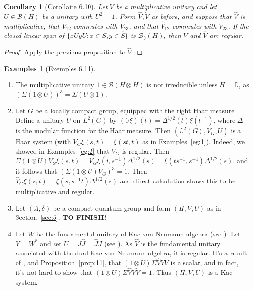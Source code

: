 \documentclass[a4paper,12pt]{article}
\theoremstyle{plain}
\newtheorem{corollary}[proposition]{Corollary}
\theoremstyle{definition}
\newtheorem{examples}[proposition]{Examples}
\newcommand{\mc}{\mathcal}
\begin{document}
\begin{corollary}[Corollaire 6.10]
Let $V$ be a multiplicative unitary and let $U\in\mc B(H)$ be a unitary with
$U^2=1$.  Form $\hat V,\tilde V$ as before, and suppose that $\hat V$ is
multiplicative, that $V_{12}$ commutes with $\tilde V_{23}$, and that
$\hat V_{12}$ commutes with $V_{23}$.  If the closed linear span of
$\{ x UyU : x\in S, y\in \hat S \}$ is $\mc B_0(H)$, then $\tilde V$ and
$\hat V$ are regular.
\end{corollary}
\begin{proof}
Apply the previous proposition to $\hat V$.
\end{proof}

\begin{examples}[Exemples 6.11]
\begin{enumerate}
\item The multiplicative unitary $1\in\mc B(H\otimes H)$ is not
irreducible unless $H=\mathbb C$, as $(\Sigma(1\otimes U))^3
= \Sigma(U\otimes 1)$.
\item Let $G$ be a locally compact group, equipped with the right Haar measure.
Define a unitary $U$ on $L^2(G)$ by $(U\xi)(t)=\Delta^{1/2}(t)\xi(t^{-1})$,
where $\Delta$ is the modular function for the Haar measure.  Then
$(L^2(G), V_G, U)$ is a Haar system (with $V_G\xi(s,t)=\xi(st,t)$ as
in Examples~\ref{eg:1}).  Indeed, we showed in Examples~\ref{eg:2} that $V_G$
is regular.  Then $\Sigma(1\otimes U)V_G\xi(s,t) = V_G\xi(t,s^{-1})\Delta^{1/2}(s)
= \xi(ts^{-1},s^{-1})\Delta^{1/2}(s)$, and it follows that
$(\Sigma(1\otimes U)V_G)^3=1$.  Then $\hat V_G\xi(s,t) = \xi(s,s^{-1}t)
\Delta^{1/2}(s)$ and direct calculation shows this to be multiplicative
and regular.
\item Let $(A,\delta)$ be a compact quantum group and form $(H,V,U)$ as
in Section~\ref{sec:5}.  \textbf{TO FINISH!}
\item Let $W$ be the fundamental unitary of Kac-von Neumann algebra
(see \cite{r6}).  Let $V=W^*$ and set $U=J\hat J = \hat JJ$ (see \cite{r38}).
As $\hat V$ is the fundamental unitary associated with the dual Kac-von Neumann
algebra, it is regular.  It's a result of \cite{r38}, and
Proposition~\ref{prop:11}, that $(1\otimes U)\Sigma \hat V V \tilde V$ is a
scalar, and in fact, it's not hard to show that $(1\otimes U)\Sigma \hat V V
\tilde V = 1$.  Thus $(H,V,U)$ is a Kac system.
\end{enumerate}
\end{examples}
\end{document}
